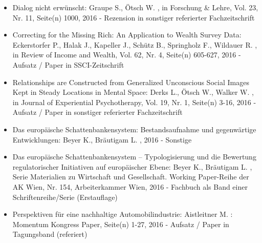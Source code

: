 \begin{itemize}
	 \item Dialog nicht erwünscht: Graupe S., Ötsch W. , in Forschung & Lehre, Vol. 23, Nr. 11, Seite(n) 1000, 2016 - Rezension in sonstiger referierter Fachzeitschrift
	 \item Correcting for the Missing Rich: An Application to Wealth Survey Data: Eckerstorfer P., Halak J., Kapeller J., Schütz B., Springholz F., Wildauer R. , in Review of Income and Wealth, Vol. 62, Nr. 4, Seite(n) 605-627, 2016 - Aufsatz / Paper in SSCI-Zeitschrift
	 \item Relationships are Constructed from Generalized Unconscious Social Images Kept in Steady Locations in Mental Space: Derks L., Ötsch W., Walker W. , in Journal of Experiential Psychotherapy, Vol. 19, Nr. 1, Seite(n) 3-16, 2016 - Aufsatz / Paper in sonstiger referierter Fachzeitschrift
	 \item Das europäische Schattenbankensystem: Bestandsaufnahme und gegenwärtige Entwicklungen: Beyer K., Bräutigam L. , 2016 - Sonstige
	 \item Das europäische Schattenbankensystem – Typologisierung und die Bewertung regulatorischer Initiativen auf europäischer Ebene: Beyer K., Bräutigam L. , Serie Materialien zu Wirtschaft und Gesellschaft. Working Paper-Reihe der AK Wien, Nr. 154, Arbeiterkammer Wien, 2016 - Fachbuch als Band einer Schriftenreihe/Serie (Erstauflage)
	 \item Perspektiven für eine nachhaltige Automobilindustrie: Aistleitner M. : Momentum Kongress Paper, Seite(n) 1-27, 2016 - Aufsatz / Paper in Tagungsband (referiert)
\end{itemize} 
